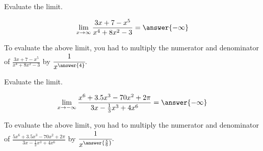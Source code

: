 \documentclass[handout]{ximera}
\begin{document}
\begin{exercise}

Evaluate the limit. 

\[ \displaystyle\lim_{x \to \infty} \frac{3x +7 - x^5}{x^4 + 8x^2 -3} = \answer{-\infty} \]

\begin{exercise}

To evaluate the above limit, you had to multiply the numerator and denominator of $\frac{3x +7 - x^5}{x^4 + 8x^2 -3}$ by $\cfrac{1}{x^{\answer{4}}}.$

\end{exercise}

\end{exercise}

\begin{exercise}

Evaluate the limit. 

\[ \displaystyle\lim_{x \to -\infty} \frac{x^6 + 3.5x^3 -70x^2 + 2\pi}{3x - \frac{1}{3}x^3+ 4x^6} = \answer{-\infty} \]

\begin{exercise}

To evaluate the above limit, you had to multiply the numerator and denominator of $\frac{5x^6 + 3.5x^3 -70x^2 + 2\pi}{3x - \frac{1}{3}x^3+ 4x^6}$ by $\cfrac{1}{x^{\answer{\frac{5}{6}}}}.$

\end{exercise}

\end{exercise}
\end{document}
